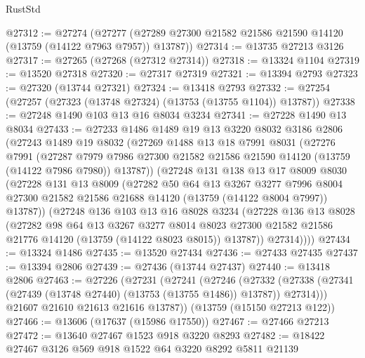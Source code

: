 \begin{lexlean}{RustStd}
\begin{coremodule}
@27312 := @27274
    (@27277 (@27289 @27300 @21582 @21586 @21590 @14120 (@13759 (@14122 @7963 @7957)) @13787))
@27314 := @13735 @27213 @3126
@27317 := @27265 (@27268 (@27312 @27314))
@27318 := @13324 @1104
@27319 := @13520 @27318
@27320 := @27317 @27319
@27321 := @13394 @2793
@27323 := @27320 (@13744 @27321)
@27324 := @13418 @2793
@27332 := @27254 (@27257 (@27323 (@13748 @27324) (@13753 (@13755 @1104)) @13787))
@27338 := @27248 @1490 @103 @13 @16 @8034 @3234
@27341 := @27228 @1490 @13 @8034
@27433 := @27233
    @1486
    @1489
    @19
    @13
    @3220
    @8032
    @3186
    @2806
    (@27243
      @1489
      @19
      @8032
      (@27269
        @1488
        @13
        @18
        @7991
        @8031
        (@27276
          @7991
          (@27287
            @7979
            @7986
            @27300
            @21582
            @21586
            @21590
            @14120
            (@13759 (@14122 @7986 @7980))
            @13787))
        (@27248
          @131
          @138
          @13
          @17
          @8009
          @8030
          (@27228
            @131
            @13
            @8009
            (@27282
              @50
              @64
              @13
              @3267
              @3277
              @7996
              @8004
              @27300
              @21582
              @21586
              @21688
              @14120
              (@13759 (@14122 @8004 @7997))
              @13787))
          (@27248
            @136
            @103
            @13
            @16
            @8028
            @3234
            (@27228
              @136
              @13
              @8028
              (@27282
                @98
                @64
                @13
                @3267
                @3277
                @8014
                @8023
                @27300
                @21582
                @21586
                @21776
                @14120
                (@13759 (@14122 @8023 @8015))
                @13787))
            @27314))))
@27434 := @13324 @1486
@27435 := @13520 @27434
@27436 := @27433 @27435
@27437 := @13394 @2806
@27439 := @27436 (@13744 @27437)
@27440 := @13418 @2806
@27463 := @27226
    (@27231
      (@27241
        (@27246
          (@27332 (@27338 (@27341 (@27439 (@13748 @27440) (@13753 (@13755 @1486)) @13787)) @27314)))
        @21607
        @21610
        @21613
        @21616
        @13787))
    (@13759 (@15150 @27213 @122))
@27466 := @13606 (@17637 (@15986 @17550))
@27467 := @27466 @27213
@27472 := @13640 @27467 @1523 @918 @3220 @8293
@27482 := @18422 @27467 @3126 @569 @918 @1522 @64 @3220 @8292 @5811 @21139

\end{coremodule}
\end{lexlean}

